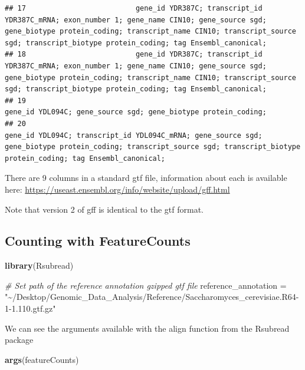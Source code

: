\documentclass[
]{book}
\newenvironment{Shaded}{\begin{snugshade}}{\end{snugshade}}
\newcommand{\CommentTok}[1]{\textcolor[rgb]{0.56,0.35,0.01}{\textit{#1}}}
\newcommand{\FunctionTok}[1]{\textcolor[rgb]{0.13,0.29,0.53}{\textbf{#1}}}
\newcommand{\NormalTok}[1]{#1}
\newcommand{\OtherTok}[1]{\textcolor[rgb]{0.56,0.35,0.01}{#1}}
\newcommand{\StringTok}[1]{\textcolor[rgb]{0.31,0.60,0.02}{#1}}
\begin{document}
\begin{verbatim}
## 17                          gene_id YDR387C; transcript_id YDR387C_mRNA; exon_number 1; gene_name CIN10; gene_source sgd; gene_biotype protein_coding; transcript_name CIN10; transcript_source sgd; transcript_biotype protein_coding; tag Ensembl_canonical;
## 18                          gene_id YDR387C; transcript_id YDR387C_mRNA; exon_number 1; gene_name CIN10; gene_source sgd; gene_biotype protein_coding; transcript_name CIN10; transcript_source sgd; transcript_biotype protein_coding; tag Ensembl_canonical;
## 19                                                                                                                                                                                              gene_id YDL094C; gene_source sgd; gene_biotype protein_coding;
## 20                                                                                 gene_id YDL094C; transcript_id YDL094C_mRNA; gene_source sgd; gene_biotype protein_coding; transcript_source sgd; transcript_biotype protein_coding; tag Ensembl_canonical;
\end{verbatim}

There are 9 columns in a standard gtf file, information about each is available here: \url{https://useast.ensembl.org/info/website/upload/gff.html}

Note that version 2 of gff is identical to the gtf format.

\hypertarget{counting-with-featurecounts}{%
\subsection{Counting with FeatureCounts}\label{counting-with-featurecounts}}

\begin{Shaded}
\begin{Highlighting}[]
\FunctionTok{library}\NormalTok{(Rsubread)}

\CommentTok{\# Set path of the reference annotation gzipped gtf file}
\NormalTok{reference\_annotation }\OtherTok{=} \StringTok{"\textasciitilde{}/Desktop/Genomic\_Data\_Analysis/Reference/Saccharomyces\_cerevisiae.R64{-}1{-}1.110.gtf.gz"}
\end{Highlighting}
\end{Shaded}

We can see the arguments available with the align function from the Rsubread package

\begin{Shaded}
\begin{Highlighting}[]
\FunctionTok{args}\NormalTok{(featureCounts)}
\end{Highlighting}
\end{Shaded}
\end{document}
